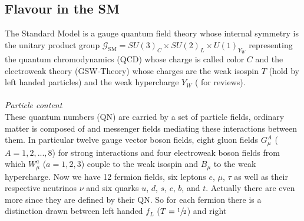 \subsection{Flavour in the SM}
The Standard Model is a gauge quantum field theory whose internal symmetry is the unitary product group $\mathcal{G}_\text{SM}=SU(3)_C\times SU(2)_L\times U(1)_{Y_W}$ representing
the quantum chromodynamics (QCD) whose charge is called color $C$ and the electroweak theory (GSW-Theory) whose charges are the weak isospin $T$ 
(hold by left handed particles) and the weak hypercharge $Y_W$ (\cite{Peskin}\cite{MDSchwartz}\cite{Langacker} for reviews). 
\\ \\ \textit{Particle content}\\
\noindent These quantum numbers (QN) are carried by a set of particle fields, ordinary matter is composed
of and messenger fields mediating these interactions between them. In particular twelve gauge vector boson fields, eight gluon fields $G^A_\mu$ ($A=1,2,...,8$)
for strong 
interactions and four electroweak boson fields from which $W^a_\mu$ ($a=1,2,3$) couple to the weak isospin and $B_\mu$ to the weak hypercharge. Now we have 12
fermion fields, six leptons $e$, $\mu$, $\tau$ as well as their respective neutrinos $\nu$ and six quarks $u$, $d$, $s$, $c$, $b$, and $t$. Actually there
are even more since they are defined by their QN. So for each fermion there is a distinction drawn between left handed $f_L$ ($T=\sfrac12$) and right 
